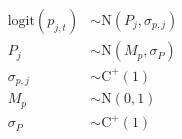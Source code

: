 \documentclass[12pt,letterpaper]{article}
\begin{document}
\begin{equation}
  \begin{aligned}
    \mathrm{logit}(p_{j, t}) &\sim \mathrm{N}(P_{j}, \sigma_{p, j}) \\
    P_{j} &\sim \mathrm{N}(M_{p}, \sigma_{P}) \\
    \sigma_{p, j} &\sim \mathrm{C}^{+}(1) \\
    M_{p} &\sim \mathrm{N}(0, 1) \\
    \sigma_{P} &\sim \mathrm{C}^{+}(1) \\
  \end{aligned}
\end{equation}
\end{document}
